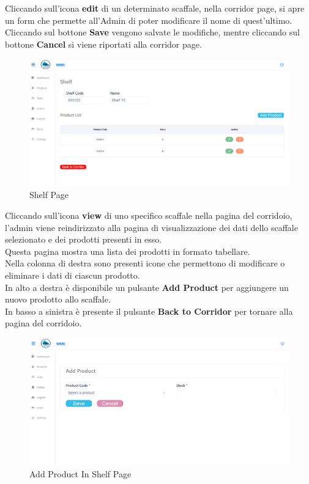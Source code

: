 Cliccando sull'icona \textbf{edit} di un determinato scaffale, nella corridor page, si apre un form
che permette all'Admin di poter modificare il nome di quest'ultimo.\\
Cliccando sul bottone \textbf{Save} vengono salvate le modifiche, mentre cliccando sul bottone \textbf{Cancel} si viene
riportati alla corridor page.

\begin{figure}[H]
    \centering
    \includegraphics[width=\textwidth]{document/sections/img/Storyboard/viewShelf.png}
    \caption{Shelf Page}
    \label{fig:shelfPage}
\end{figure}

Cliccando sull'icona \textbf{view} di uno specifico scaffale nella pagina del corridoio, l'admin viene reindirizzato alla pagina di visualizzazione dei dati dello scaffale selezionato e dei prodotti presenti in esso.\\
Questa pagina mostra una lista dei prodotti in formato tabellare.\\
Nella colonna di destra sono presenti icone che permettono di modificare o eliminare i dati di ciascun prodotto.\\
In alto a destra è disponibile un pulsante \textbf{Add Product} per aggiungere un nuovo prodotto allo scaffale.\\
In basso a sinistra è presente il pulsante \textbf{Back to Corridor} per tornare alla pagina del corridoio.

\begin{figure}[H]
    \centering
    \includegraphics[width=\textwidth]{document/sections/img/Storyboard/addProductInShelf.png}
    \caption{Add Product In Shelf Page}
    \label{fig:addProductInShelfPage}
\end{figure}

